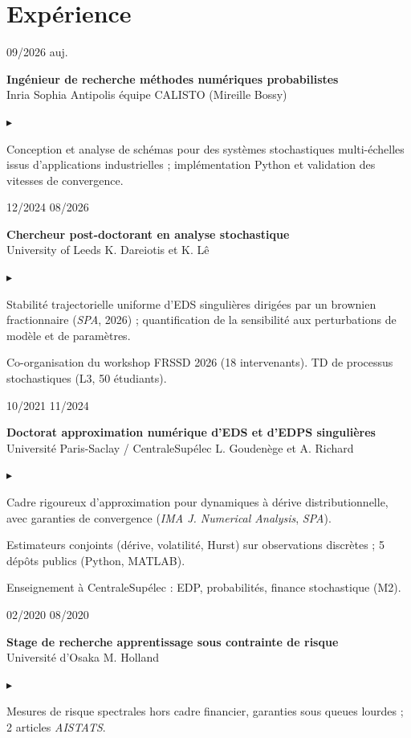 \documentclass[10pt,a4paper]{article}
\newlength{\datecol}\setlength{\datecol}{0.155\textwidth}
\newlength{\gutter}\setlength{\gutter}{0.85em}
\newlength{\bodycol}
\newcommand{\entry}[3]{%
  \par\vspace{0.55ex}\noindent
  \begin{minipage}[t]{\datecol}
    \vspace{0pt}\raggedright\footnotesize\color{muted}#1
  \end{minipage}%
  \hspace{\gutter}%
  \begin{minipage}[t]{\bodycol}
    \vspace{0pt}\raggedright
    {\headingfont\bfseries\footnotesize #2}\\[0.08ex]
    {\footnotesize\color{accent}#3}
  \end{minipage}%
  \par\vspace{0.12ex}
}
\newenvironment{bullets}
  {\begin{list}{\textcolor{accent}{\scriptsize$\blacktriangleright$}}{%
      \setlength{\leftmargin}{\datecol}
      \addtolength{\leftmargin}{\gutter}
      \addtolength{\leftmargin}{1.15em}
      \setlength{\rightmargin}{0pt}
      \setlength{\labelwidth}{0.85em}
      \setlength{\labelsep}{0.3em}
      \setlength{\itemsep}{0.08ex}
      \setlength{\parsep}{0pt}
      \setlength{\topsep}{0.2ex}
      \setlength{\partopsep}{0pt}
      \footnotesize}}
  {\end{list}}
\begin{document}
\section{Expérience}

\entry{09/2026 \textemdash{} auj.}{Ingénieur de recherche \textemdash{} méthodes numériques probabilistes}{Inria Sophia Antipolis \textemdash{} équipe CALISTO (Mireille Bossy)}
\begin{bullets}
  \item Conception et analyse de schémas pour des systèmes stochastiques multi-échelles issus d'applications
  industrielles ; implémentation Python et validation des vitesses de convergence.
\end{bullets}

\entry{12/2024 \textemdash{} 08/2026}{Chercheur post-doctorant en analyse stochastique}{University of Leeds \textemdash{} K. Dareiotis et K. Lê}
\begin{bullets}
  \item Stabilité trajectorielle uniforme d'EDS singulières dirigées par un brownien fractionnaire
  (\emph{SPA}, 2026) ; quantification de la sensibilité aux perturbations de modèle et de paramètres.
  \item Co-organisation du workshop FRSSD 2026 (18 intervenants). TD de processus stochastiques (L3, 50 étudiants).
\end{bullets}

\entry{10/2021 \textemdash{} 11/2024}{Doctorat \textemdash{} approximation numérique d'EDS et d'EDPS singulières}{Université Paris-Saclay / CentraleSupélec \textemdash{} L. Goudenège et A. Richard}
\begin{bullets}
  \item Cadre rigoureux d'approximation pour dynamiques à dérive distributionnelle, avec garanties de
  convergence (\emph{IMA J. Numerical Analysis}, \emph{SPA}).
  \item Estimateurs conjoints (dérive, volatilité, Hurst) sur observations discrètes ; 5 dépôts publics
  (Python, MATLAB).
  \item Enseignement à CentraleSupélec : EDP, probabilités, finance stochastique (M2).
\end{bullets}

\entry{02/2020 \textemdash{} 08/2020}{Stage de recherche \textemdash{} apprentissage sous contrainte de risque}{Université d'Osaka \textemdash{} M. Holland}
\begin{bullets}
  \item Mesures de risque spectrales hors cadre financier, garanties sous queues lourdes ; 2 articles
  \emph{AISTATS}.
\end{bullets}
\end{document}
